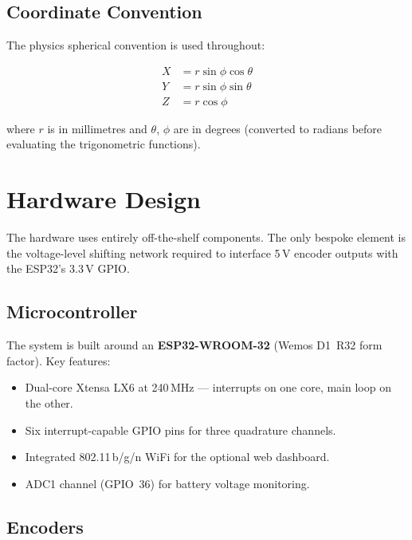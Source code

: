 \documentclass[11pt,a4paper]{article}
\begin{document}
\subsection{Coordinate Convention}

The physics spherical convention is used throughout:

\begin{align}
  X &= r \sin\phi \cos\theta \label{eq:x}\\
  Y &= r \sin\phi \sin\theta \label{eq:y}\\
  Z &= r \cos\phi             \label{eq:z}
\end{align}

where \(r\) is in millimetres and \(\theta\), \(\phi\) are in degrees
(converted to radians before evaluating the trigonometric functions).

\section{Hardware Design}
\label{sec:hw}

The hardware uses entirely off-the-shelf components.  The only bespoke
element is the voltage-level shifting network required to interface 5\,V
encoder outputs with the ESP32's 3.3\,V GPIO.

\subsection{Microcontroller}

The system is built around an \textbf{ESP32-WROOM-32} (Wemos D1~R32
form factor).  Key features:

\begin{itemize}[noitemsep, topsep=4pt]
  \item Dual-core Xtensa LX6 at 240\,MHz --- interrupts on one core,
        main loop on the other.
  \item Six interrupt-capable GPIO pins for three quadrature channels.
  \item Integrated 802.11\,b/g/n WiFi for the optional web dashboard.
  \item ADC1 channel (GPIO~36) for battery voltage monitoring.
\end{itemize}

\subsection{Encoders}
\end{document}
